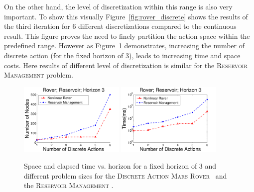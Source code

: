 \documentclass[twoside,11pt]{article}
\newcommand{\MarsRover}{\textsc{Mars Rover }}
\newcommand{\WaterReservoir}{\textsc{Reservoir Management }}
\begin{document}
On the other hand, the level of discretization within this range is also very important. To show this visually Figure~\ref{fig:rover_discrete} shows the results of the third iteration for 6 different discretizations compared to the continuous result. This figure proves the need to finely partition the action space within the predefined range. However as Figure~\ref{fig:roverDisSize} demonstrates, increasing the number of discrete action (for the fixed horizon of 3), leads to increasing time and space costs. Here results of different level of discretization is similar for the \WaterReservoir problem.

\begin{figure}[tbp!]
\vspace{-2mm}
\centering
\includegraphics[width=0.45\textwidth]{pics/disRovResNode2.pdf}
\hspace{2mm}
\includegraphics[width=0.45\textwidth]{pics/disRovResTime2.pdf}
\vspace{-2mm}
\caption{%
Space and elapsed time vs. horizon for a fixed horizon of 3 and different problem sizes for the \textsc{Discrete Action} \MarsRover\ and the \WaterReservoir. 
}
\label{fig:roverDisSize}
\vspace{-5mm}
\end{figure}
\end{document}
